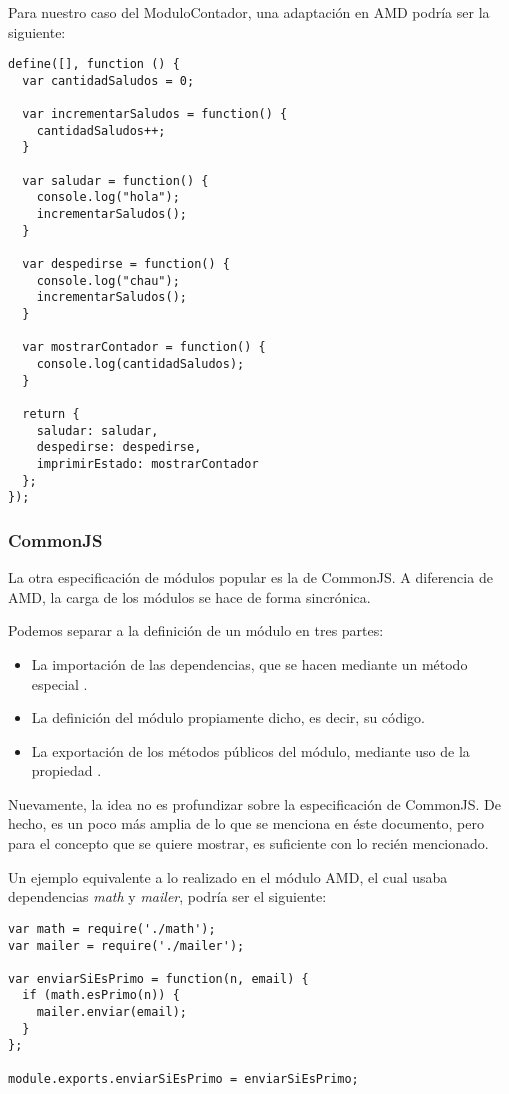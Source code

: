 Para nuestro caso del ModuloContador, una adaptación en AMD podría ser la siguiente:

\begin{lstlisting}[title={Modulo contador en AMD}]
define([], function () {
  var cantidadSaludos = 0;

  var incrementarSaludos = function() {
    cantidadSaludos++;
  }

  var saludar = function() {
    console.log("hola");
    incrementarSaludos();
  }

  var despedirse = function() {
    console.log("chau");
    incrementarSaludos();
  }

  var mostrarContador = function() {
    console.log(cantidadSaludos);
  }

  return {
    saludar: saludar,
    despedirse: despedirse,
    imprimirEstado: mostrarContador
  };
});
\end{lstlisting}

\subsubsection{CommonJS}

La otra especificación de módulos popular es la de CommonJS. A diferencia de AMD, la carga de los módulos se hace de forma sincrónica.

Podemos separar a la definición de un módulo en tres partes:
\begin{itemize}
	\item La importación de las dependencias, que se hacen mediante un método especial .
	\item La definición del módulo propiamente dicho, es decir, su código.
	\item La exportación de los métodos públicos del módulo, mediante uso de la propiedad .
\end{itemize}

Nuevamente, la idea no es profundizar sobre la especificación de CommonJS. De hecho, es un poco más amplia de lo que se menciona en éste documento, pero para el concepto que se quiere mostrar, es suficiente con lo recién mencionado.

Un ejemplo equivalente a lo realizado en el módulo AMD, el cual usaba dependencias \textit{math} y \textit{mailer}, podría ser el siguiente:

\begin{lstlisting}
var math = require('./math');
var mailer = require('./mailer');

var enviarSiEsPrimo = function(n, email) {
  if (math.esPrimo(n)) {
    mailer.enviar(email);
  }
};

module.exports.enviarSiEsPrimo = enviarSiEsPrimo;
\end{lstlisting}

